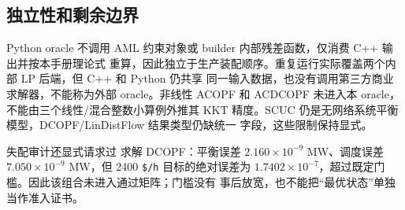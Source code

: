 \subsection{独立性和剩余边界}
Python oracle 不调用 AML 约束对象或 builder 内部残差函数，仅消费 C++ 输出并按本手册理论式
重算，因此独立于生产装配顺序。重复运行实际覆盖两个内部 LP 后端，但 C++ 和 Python 仍共享
同一输入数据，也没有调用第三方商业求解器，不能称为外部 oracle。非线性 ACOPF 和 ACDCOPF
未进入本 oracle，不能由三个线性/混合整数小算例外推其 KKT 精度。SCUC 仍是无网络系统平衡
模型，DCOPF/LinDistFlow 结果类型仍缺统一  字段，这些限制保持显式。

失配审计还显式请求过  求解 DCOPF：平衡误差
$2.160\times10^{-9}$ MW、调度误差 $7.050\times10^{-9}$ MW，但 2400 \texttt{\$/h}
目标的绝对误差为 $1.7402\times10^{-7}$，超过既定门槛。因此该组合未进入通过矩阵；门槛没有
事后放宽，也不能把“最优状态”单独当作准入证书。
